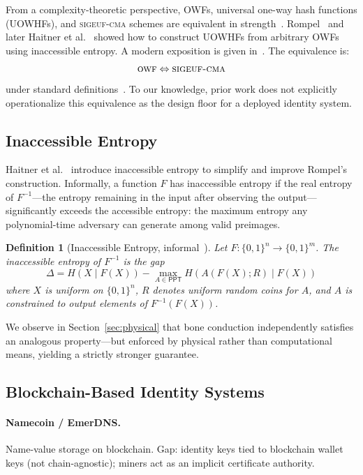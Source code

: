 \documentclass[12pt,a4paper]{article}
\newtheorem{definition}{Definition}
\begin{document}
From a complexity-theoretic perspective, OWFs, universal one-way hash
functions (UOWHFs), and \textsc{sigeuf-cma} schemes are equivalent in
strength~\cite{NaorYung89}. Rompel~\cite{Rompel90} and later Haitner et
al.~\cite{Haitner10} showed how to construct UOWHFs from arbitrary OWFs
using inaccessible entropy. A modern exposition is given
in~\cite{KatzKoo05}. The equivalence is:
\[
  \textsc{owf} \Leftrightarrow \textsc{sigeuf-cma}
\]
under standard definitions~\cite{Rompel90,Goldreich01}. To our
knowledge, prior work does not explicitly operationalize this equivalence
as the design floor for a deployed identity system.

\subsection{Inaccessible Entropy}

Haitner et al.~\cite{Haitner10} introduce inaccessible entropy to
simplify and improve Rompel's construction. Informally, a function $F$
has inaccessible entropy if the real entropy of $F^{-1}$---the entropy
remaining in the input after observing the output---significantly exceeds
the accessible entropy: the maximum entropy any polynomial-time adversary
can generate among valid preimages.

\begin{definition}[Inaccessible Entropy, informal~\cite{Haitner10}]
\label{def:inac}
Let $F : \{0,1\}^n \to \{0,1\}^m$. The inaccessible entropy of $F^{-1}$
is the gap
\[
  \Delta = H(X \mid F(X)) - \max_{A \in \mathsf{PPT}}
  H(A(F(X); R) \mid F(X))
\]
where $X$ is uniform on $\{0,1\}^n$, $R$ denotes uniform random coins
for $A$, and $A$ is constrained to output elements of $F^{-1}(F(X))$.
\end{definition}

We observe in Section~\ref{sec:physical} that bone conduction
independently satisfies an analogous property---but enforced by physical
rather than computational means, yielding a strictly stronger guarantee.

\subsection{Blockchain-Based Identity Systems}

\paragraph{Namecoin / EmerDNS.} Name-value storage on blockchain. Gap:
identity keys tied to blockchain wallet keys (not chain-agnostic); miners
act as an implicit certificate authority.
\end{document}
